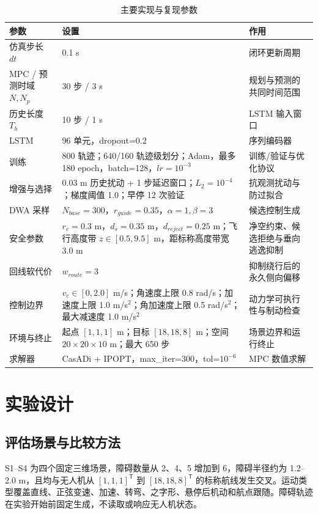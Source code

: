 \documentclass[10pt,a4paper,twocolumn]{ctexart}
\begin{document}
\begin{table}[t]
\centering
\small
\caption{主要实现与复现参数}
\label{tab:table-1}
\begin{tabularx}{\textwidth}{YYY}
\toprule
参数 & 设置 & 作用 \\
\midrule
仿真步长 $dt$ & 0.1 s & 闭环更新周期 \\
MPC / 预测时域 $N,N_p$ & 30 步 / 3 s & 规划与预测的共同时间范围 \\
历史长度 $T_h$ & 10 步 / 1 s & LSTM 输入窗口 \\
LSTM & 96 单元，dropout=0.2 & 序列编码器 \\
训练 & 800 轨迹；640/160 轨迹级划分；Adam，最多 180 epoch，batch=128，$lr=10^{-3}$ & 训练/验证与优化协议 \\
增强与选择 & 0.03 m 历史扰动 + 1 步延迟窗口；$L_2=10^{-4}$；梯度阈值 1.0；早停 12 次验证 & 抗观测扰动与防过拟合 \\
DWA 采样 & $N_{base}=300$，$r_{guide}=0.35$，$\alpha=1,\beta=3$ & 候选控制生成 \\
安全参数 & $r_e=0.3$ m，$d_s=0.35$ m，$d_{reject}=0.25$ m；飞行高度带 $z\in[0.5,9.5]$ m，距标称高度带宽 3.0 m & 净空约束、候选拒绝与垂向逃逸抑制 \\
回线软代价 & $w_{route}=3$ & 抑制绕行后的永久侧向偏移 \\
控制边界 & $v_c\in[0,2.0]$ m/s；角速度上限 0.8 rad/s；加速度上限 1.0 m/s$^2$；角加速度上限 0.5 rad/s$^2$；最大减速度 1.0 m/s$^2$ & 动力学可执行性与制动检查 \\
环境与终止 & 起点 $[1,1,1]$ m；目标 $[18,18,8]$ m；空间 $20\times20\times10$ m；最大 650 步 & 场景边界和运行终止 \\
求解器 & CasADi + IPOPT，max\_iter=300，tol=$10^{-6}$ & MPC 数值求解 \\
\bottomrule
\end{tabularx}
\end{table}

\section{实验设计}

\subsection{评估场景与比较方法}

S1–S4 为四个固定三维场景，障碍数量从 2、4、5 增加到 6，障碍半径约为 1.2–2.0 m，且均与无人机从 $[1,1,1]^\mathsf{T}$ 到 $[18,18,8]^\mathsf{T}$ 的标称航线发生交叉。运动类型覆盖直线、正弦变速、加速、转弯、之字形、悬停后机动和航点跟随。障碍轨迹在实验开始前固定生成，不读取或响应无人机状态。
\end{document}
